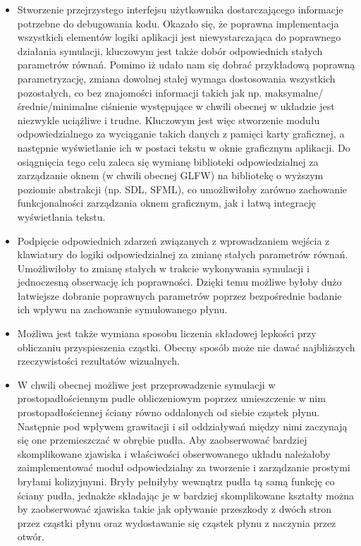 \documentclass[polish, 12pt]{aghthesis}
\begin{document}
		\begin{itemize}
		
			\item Stworzenie przejrzystego interfejsu użytkownika dostarczającego informacje potrzebne do debugowania kodu. Okazało się, że poprawna implementacja wszystkich elementów logiki aplikacji jest niewystarczająca do poprawnego działania symulacji, kluczowym jest także dobór odpowiednich stałych parametrów równań. Pomimo iż udało nam się dobrać przykładową poprawną parametryzację, zmiana dowolnej stałej wymaga dostosowania wszystkich pozostałych, co bez znajomości informacji takich jak np. maksymalne/średnie/minimalne ciśnienie występujące w chwili obecnej w układzie jest niezwykle uciążliwe i trudne. Kluczowym jest więc stworzenie modułu odpowiedzialnego za wyciąganie takich danych z pamięci karty graficznej, a następnie wyświetlanie ich w postaci tekstu w oknie graficznym aplikacji. Do osiągnięcia tego celu zaleca się wymianę biblioteki odpowiedzialnej za zarządzanie oknem (w chwili obecnej GLFW) na bibliotekę o wyższym poziomie abstrakcji (np. SDL, SFML), co umożliwiłoby zarówno zachowanie funkcjonalności zarządzania oknem graficznym, jak i łatwą integrację wyświetlania tekstu.
			
			\item Podpięcie odpowiednich zdarzeń związanych z wprowadzaniem wejścia z klawiatury do logiki odpowiedzialnej za zmianę stałych parametrów równań. Umożliwiłoby to zmianę stałych w trakcie wykonywania symulacji i jednoczesną obserwację ich poprawności. Dzięki temu możliwe byłoby dużo łatwiejsze dobranie poprawnych parametrów poprzez bezpośrednie badanie ich wpływu na zachowanie symulowanego płynu.
			
			\item Możliwa jest także wymiana sposobu liczenia składowej lepkości przy obliczaniu przyspieszenia cząstki. Obecny sposób może nie dawać najbliższych rzeczywistości rezultatów wizualnych.
			
			\item W chwili obecnej możliwe jest przeprowadzenie symulacji w prostopadłościennym pudle obliczeniowym poprzez umieszczenie w nim prostopadłościennej ściany równo oddalonych od siebie cząstek płynu. Następnie pod wpływem grawitacji i sił oddziaływań między nimi zaczynają się one przemieszczać w obrębie pudła. Aby zaobserwować bardziej skomplikowane zjawiska i właściwości obserwowanego układu należałoby zaimplementować moduł odpowiedzialny za tworzenie i zarządzanie prostymi bryłami kolizyjnymi. Bryły pełniłyby wewnątrz pudła tą samą funkcję co ściany pudła, jednakże składając je w bardziej skomplikowane kształty można by zaobserwować zjawiska takie jak opływanie przeszkody z dwóch stron przez cząstki płynu oraz wydostawanie się cząstek płynu z naczynia przez otwór.
			

\end{itemize}
\end{document}
